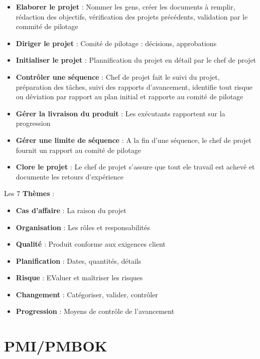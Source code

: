 \documentclass{report}
\begin{document}
		\begin{itemize}
			\item \textbf{Elaborer le projet} : Nommer les gens, créer les documents à remplir, rédaction des objectifs, vérification des projets précédents, validation par le commité de pilotage
			\item \textbf{Diriger le projet} : Comité de pilotage : décisions, approbations
			\item \textbf{Initialiser le projet} : Plannification du projet en détail par le chef de projet
			\item \textbf{Contrôler une séquence} : Chef de projet fait le suivi du projet, préparation des tâches, suivi des rapports d'avancement, identifie tout risque ou déviation par rapport au plan initial et rapporte au comité de pilotage
			\item \textbf{Gérer la livraison du produit} : Les exécutants rapportent sur la progression
			\item \textbf{Gérer une limite de séquence} : A la fin d'une séquence, le chef de projet fournit un rapport au comité de pilotage
			\item \textbf{Clore le projet} : Le chef de projet s'assure que tout ele travail est achevé et documente les retours d'expérience
		\end{itemize}

		Les 7 \textbf{Thèmes} : \\
		
		\begin{itemize}
			\item \textbf{Cas d'affaire} : La raison du projet
			\item \textbf{Organisation} : Les rôles et responsabilités
			\item \textbf{Qualité} : Produit conforme aux exigences client
			\item \textbf{Planification} : Dates, quantités, détails
			\item \textbf{Risque} : EValuer et maîtriser les risques
			\item \textbf{Changement} : Catégoriser, valider, contrôler
			\item \textbf{Progression} : Moyens de contrôle de l'avancement
		\end{itemize}


	\section{PMI/PMBOK}
\end{document}
